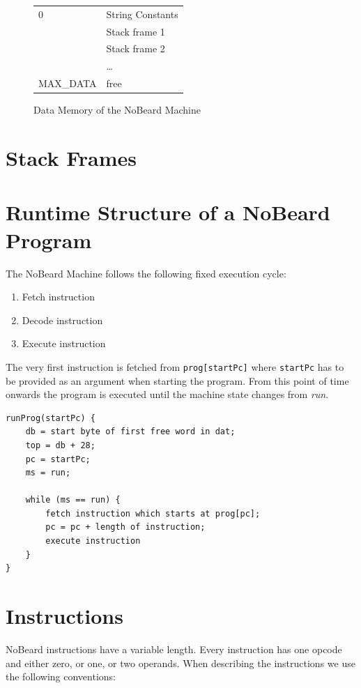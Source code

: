 \documentclass[11pt]{report}
\newcommand{\leongage}{NoBeard}
\begin{document}
\begin{figure}\label{fig:datamemory}
\begin{center}
\begin{tabular}{p{8em}|p{8em}|}
\cline{2-2}
\parbox[t][3em][t]{8em}{\hfill 0} & String Constants \\[3em] 
& Stack frame 1 \\[2em] 
& Stack frame 2 \\[2em] 
& \ldots \\[2em] 
\parbox[b][4em][b]{8em}{\hfill MAX\_DATA} & free \\ 
\end{tabular}
\end{center}
\caption{Data Memory of the \leongage{} Machine}
\end{figure}

\section{Stack Frames}\label{sec:stackframes}

\section{Runtime Structure of a \leongage{} Program}
The \leongage{} Machine follows the following fixed execution cycle:
\begin{enumerate}
	\item Fetch instruction
	\item Decode instruction
	\item Execute instruction
\end{enumerate}
The very first instruction is fetched from {\tt prog[startPc]} where {\tt startPc} has to be provided as an argument when starting the program. From this point of time onwards the program is executed until the machine state changes from {\em run}.

\begin{lstlisting}
runProg(startPc) {
	db = start byte of first free word in dat;
	top = db + 28;
	pc = startPc;
	ms = run;
	
	while (ms == run) {
		fetch instruction which starts at prog[pc];
		pc = pc + length of instruction;
		execute instruction
	}
}
\end{lstlisting}

\section{Instructions}
\leongage{} instructions have a variable length. Every instruction has one opcode and either zero, or one, or two operands. When describing the instructions we use the following conventions:
\end{document}
